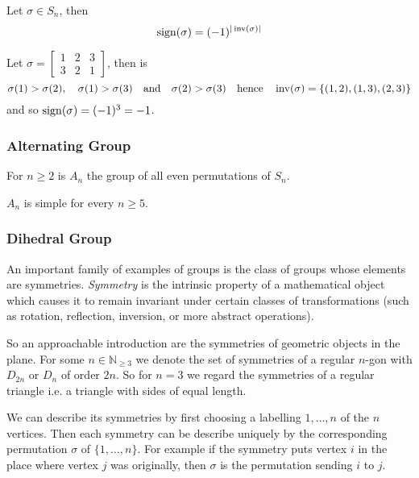 \begin{proposition}
   Let \(\sigma \in S_n\), then
   \[\operatorname{sign}(\sigma) = (-1)^{|\operatorname{inv}(\sigma)|}\]
\end{proposition}
\begin{example}
   Let \(\sigma = \begin{bmatrix} 1 & 2 & 3\\ 3 & 2 & 1\end{bmatrix}\), then is
   \[\sigma(1) > \sigma(2),\quad \sigma(1) > \sigma(3) \quad\text{and}\quad \sigma(2) > \sigma(3) \quad\text{hence}\quad \operatorname{inv}(\sigma) = \{(1,2), (1, 3), (2, 3)\}\]
   and so \(\operatorname{sign}(\sigma) = (-1)^3 = -1\).
\end{example}

\subsubsection{Alternating Group}
\begin{definition}
   For \(n \geq 2\) is \(A_n\) the group of all even permutations of \(S_n\).
\end{definition}

\begin{proposition}
   \(A_n\) is simple for every \(n \geq 5\).
\end{proposition}

\subsubsection{Dihedral Group}\label{ssec:dihedral_groups}
An important family of examples of groups is the class of groups whose elements are symmetries.
\emph{Symmetry} is the intrinsic property of a mathematical object which causes it to remain invariant under certain classes of transformations (such as rotation, reflection, inversion, or more abstract operations).

So an approachable introduction are the symmetries of geometric objects in the plane.
For some \(n \in \mathbb{N}_{\geq 3}\) we denote the set of symmetries of a regular \(n\)-gon with \(D_{2n}\) or \(D_n\) of order \(2n\).
So for \(n=3\) we regard the symmetries of a regular triangle i.e. a triangle with sides of equal length.

We can describe its symmetries by first choosing a labelling \(1, \ldots, n\) of the \(n\) vertices.
Then each symmetry can be describe uniquely by the corresponding permutation \(\sigma\) of \(\{1, \ldots, n\}\).
For example if the symmetry puts vertex \(i\) in the place where vertex \(j\) was originally, then \(\sigma\) is the permutation sending \(i\) to \(j\).


